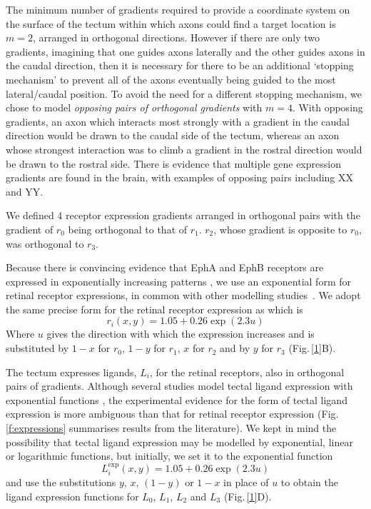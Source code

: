 \documentclass[11pt, a4paper]{article}
\begin{document}
The minimum number of gradients required to provide a coordinate system on the
surface of the tectum within which axons could find a target location is
$m=2$, arranged in orthogonal directions. However if there are only two
gradients, imagining that one guides axons laterally and the other guides
axons in the caudal direction, then it is necessary for there to be an
additional `stopping mechanism' to prevent all of the axons eventually being
guided to the most lateral/caudal position. To avoid the need for a different
stopping mechanism, we chose to model \emph{opposing pairs of orthogonal
gradients} with $m=4$. With opposing gradients, an axon which interacts most
strongly with a gradient in the caudal direction would be drawn to the caudal
side of the tectum, whereas an axon whose strongest interaction was to climb a
gradient in the rostral direction would be drawn to the rostral side. There is
evidence that multiple gene expression gradients are found in the brain, with
examples of opposing pairs including XX and YY.

We defined 4 receptor expression gradients arranged in orthogonal pairs
with the gradient of $r_0$ being orthogonal to that of $r_1$. $r_2$, whose
gradient is opposite to $r_0$, was orthogonal to $r_3$.

Because there is convincing evidence that EphA and EphB receptors are
expressed in exponentially increasing
patterns \citep{reber_relative_2004,feldheim_genetic_2000,brown_topographic_2000,koulakov_stochastic_2004},
we use an exponential form for retinal receptor expressions, in common with
other modelling
studies~\citep{reber_relative_2004,koulakov_stochastic_2004,simpson_simple_2011}.
We adopt the same precise form for the retinal receptor expression
as \citet{simpson_simple_2011} which is
\begin{equation} \label{e:retrcpt}
r_i(x,y) = 1.05 + 0.26 \exp(2.3 u)
\end{equation}
Where $u$ gives the direction with which the expression increases and is
substituted by $1-x$ for $r_0$, $1-y$ for $r_1$, $x$ for $r_2$ and by $y$ for
$r_3$ (Fig.\,\ref{1}B).

The tectum expresses ligands, $L_i$, for the retinal receptors, also in
orthogonal pairs of gradients. Although several studies model tectal ligand
expression with exponential functions \citep{koulakov_stochastic_2004}, the
experimental evidence for the form of tectal ligand expression is more ambiguous than that for
retinal receptor expression (Fig.\,\ref{f:expressions} summarises results from
the literature). We kept in mind the
possibility that tectal ligand expression may be modelled by exponential,
linear or logarithmic functions, but initially, we set it to the exponential function
\begin{equation} \label{e:tecligexp}
L_i^{\text{exp}}(x,y) = 1.05 + 0.26 \exp(2.3 u)
\end{equation}
and use the substitutions $y$, $x$, $(1-y)$ or $1-x$ in place of $u$ to obtain
the ligand expression functions for $L_0$, $L_1$, $L_2$ and $L_3$
(Fig.\,\ref{1}D).
\end{document}
